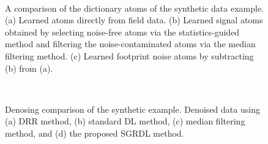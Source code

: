 \begin{figure}[htb!]
\centering
{}\\
\caption{A comparison of the dictionary atoms of the synthetic data example. (a) Learned atoms directly from field data. (b) Learned signal atoms obtained by selecting noise-free atoms via the statistics-guided method and filtering the noise-contaminated atoms via the median filtering method. (c) Learned footprint noise atoms by subtracting (b) from (a). }
\label{fig:s_atom0,s_atom1,s_atom2}
\end{figure}

\begin{figure}[htb!]
\centering
{}
\\
\caption{Denosing comparison of the synthetic example. Denoised data using (a) DRR method, (b) standard DL method, (c) median filtering method, and (d) the proposed SGRDL method. }
\label{fig:syn-drr,syn-dl,syn-mf-0,syn-sgrdl-0}
\end{figure}

